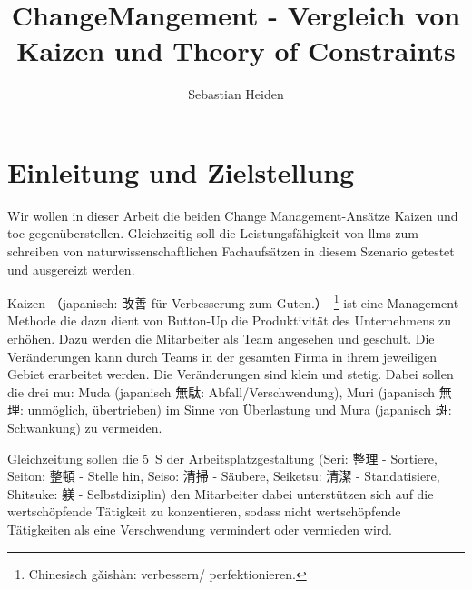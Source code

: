 \documentclass[acmlarge,authorversion,nonacm]{acmart}
\begin{document}
	


	\title{ChangeMangement - Vergleich von Kaizen und Theory of Constraints}
	
	\author{Sebastian Heiden}

\begin{abstract}

\end{abstract}


\received{\today}


\maketitle

\section{Einleitung und Zielstellung}

Wir wollen in dieser Arbeit die beiden Change Management-Ansätze Kaizen und \gls{toc} gegenüberstellen.
Gleichzeitig soll die Leistungsfähigkeit von \glspl{llm} zum schreiben von naturwissenschaftlichen Fachaufsätzen in diesem Szenario getestet und ausgereizt werden.

Kaizen （japanisch: 改善 für Verbesserung zum Guten.）~\footnote{Chinesisch gǎishàn: verbessern/ perfektionieren.} ist eine Management-Methode die dazu dient von Button-Up die Produktivität des Unternehmens zu erhöhen.
Dazu werden die Mitarbeiter als Team angesehen und geschult. Die Veränderungen kann durch Teams in der gesamten Firma in ihrem jeweiligen Gebiet erarbeitet werden.
Die Veränderungen sind klein und stetig. Dabei sollen die drei mu: Muda (japanisch 無駄: Abfall/Verschwendung), Muri (japanisch 無理: unmöglich, übertrieben) im Sinne von Überlastung und Mura (japanisch 斑: Schwankung) zu vermeiden.~\cite{helmold_kaizen_2021}

Gleichzeitung sollen die 5~S der Arbeitsplatzgestaltung (Seri: 整理 - Sortiere, Seiton: 整頓 - Stelle hin, Seiso: 清掃 - Säubere, Seiketsu: 清潔 - Standatisiere, Shitsuke:  躾 - Selbstdiziplin) den Mitarbeiter dabei unterstützen sich auf die wertschöpfende Tätigkeit zu konzentieren, sodass nicht wertschöpfende Tätigkeiten als eine Verschwendung vermindert oder vermieden wird.
\end{document}
